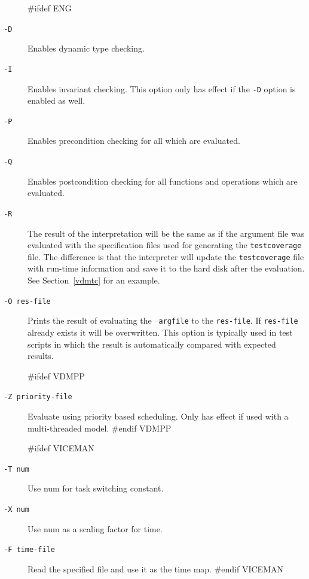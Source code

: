 \documentclass[\pformat,12pt]{article}
\begin{document}
\begin{description}

#ifdef ENG
\item[{\tt -D}] Enables dynamic type checking.
  
\item[{\tt -I}] Enables invariant checking. This option only has effect if the {\tt -D} option is enabled as well.

\item[{\tt -P}] Enables precondition checking for all
which are evaluated. 

\item[{\tt -Q}] Enables postcondition checking for all functions and
operations which are evaluated.

\item[{\tt -R}] 
  The result of the interpretation will be the same as if the argument
  file was evaluated with the specification files used for generating
  the {\tt testcoverage} file. The difference is that the interpreter
  will update the {\tt testcoverage} file with run-time information and
  save it to the hard disk after the evaluation. See Section~\ref{vdmtc}
  for an example.
  
\item[{\tt -O res-file}] Prints the result of evaluating the {\tt
    argfile} to the {\tt res-file}. If {\tt res-file} already exists
  it will be overwritten. This option is typically used in test
  scripts in which the result is automatically compared with expected
  results.

#ifdef VDMPP
\item[{\tt -Z priority-file}] Evaluate using priority based
  scheduling. Only has effect if used with a multi-threaded model.
#endif VDMPP

#ifdef VICEMAN
\item[{\tt -T num}] Use num for task switching constant.
\item[{\tt -X num}] Use num as a scaling factor for time.
\item[{\tt -F time-file}] 
                    Read the specified file and use it as the time map.
#endif VICEMAN


\end{description}
\end{document}
